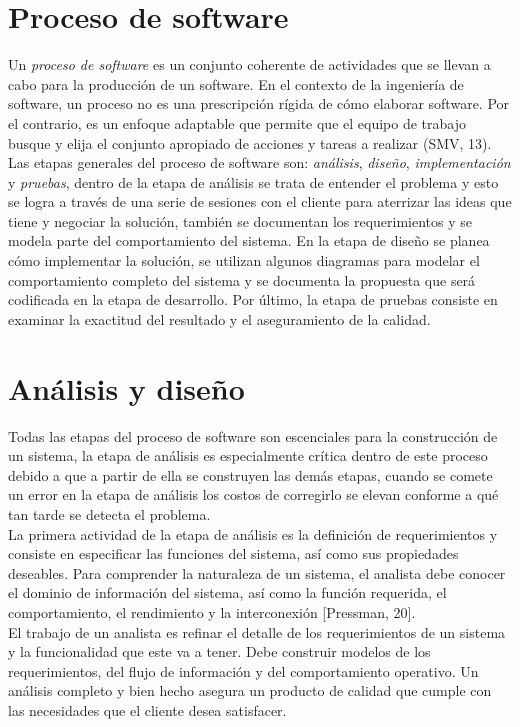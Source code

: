 \section{Proceso de software}
Un \emph{proceso de software} es un conjunto coherente de actividades que se llevan a cabo para la producción de un software. 
En el contexto de la ingeniería de software, un proceso no es una prescripción rígida de cómo
elaborar software. Por el contrario, es un enfoque adaptable que permite que
el equipo de trabajo busque y elija el conjunto apropiado de
acciones y tareas a realizar (SMV, 13).\\

Las etapas generales del proceso de software son: \emph{análisis}, \emph{diseño}, \emph{implementación} y \emph{pruebas},  
dentro de la etapa de análisis se trata de entender el problema y esto se logra a través de una serie de sesiones con el cliente 
para aterrizar las ideas que tiene y negociar la solución, también se documentan los requerimientos y se modela parte del comportamiento del sistema. En la etapa de 
diseño se planea cómo implementar la solución, se utilizan algunos diagramas para modelar el comportamiento completo del sistema y se documenta la propuesta que será
codificada en la etapa de desarrollo. 
Por último, la etapa de pruebas consiste en examinar la exactitud del resultado y el aseguramiento de la calidad.\\

\section{Análisis y diseño}
Todas las etapas del proceso de software son escenciales para la construcción de un sistema, la etapa de análisis es especialmente crítica dentro de este proceso 
debido a que a partir de ella se construyen las demás etapas, cuando se comete un error en la etapa de análisis los costos de 
corregirlo se elevan conforme a qué tan tarde se detecta el problema.\\

La primera actividad de la etapa de análisis es la definición de requerimientos y consiste en especificar las funciones del sistema, así como sus propiedades 
deseables.  Para comprender la naturaleza de un sistema, 
el analista debe conocer el dominio de información del sistema, así como la función requerida, el comportamiento, el rendimiento y la interconexión [Pressman, 20].\\

El trabajo de un analista es refinar el detalle de los requerimientos de un sistema y la funcionalidad que este va a tener. Debe construir modelos de los requerimientos, del flujo de información y del comportamiento operativo. Un análisis completo
y bien hecho asegura un producto de calidad que cumple con las necesidades que el cliente desea satisfacer. \\

